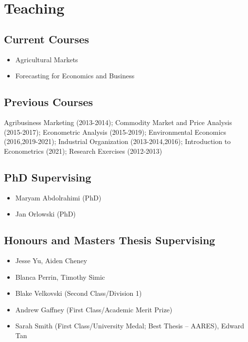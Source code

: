 \documentclass[10pt]{article}
\begin{document}
	\bigskip
	
	\section*{Teaching}
	
	\subsection*{Current Courses}
	\begin{itemize}
		\item {} Agricultural Markets
		\item {} Forecasting for Economics and Business
	\end{itemize}
	
	\subsection*{Previous Courses}	
	Agribusiness Marketing (2013-2014); Commodity Market and Price Analysis (2015-2017); Econometric Analysis (2015-2019); Environmental Economics (2016,2019-2021); Industrial Organization (2013-2014,2016); Introduction to Econometrics (2021); Research Exercises (2012-2013)
	
	\subsection*{PhD Supervising}	
	\begin{itemize}
		\item {} Maryam Abdolrahimi (PhD)
		\item {} Jan Orlowski (PhD)
	\end{itemize}
	
	\subsection*{Honours and Masters Thesis Supervising}	
	\begin{itemize}
		\item {} Jesse Yu, Aiden Cheney
		\item {} Blanca Perrin, Timothy Simic
		\item {} Blake Velkovski (Second Class/Division 1)
		\item {} Andrew Gaffney (First Class/Academic Merit Prize)
		\item {} Sarah Smith (First Class/University Medal; Best Thesis -- AARES), Edward Tan
	\end{itemize}
	
\end{document}
